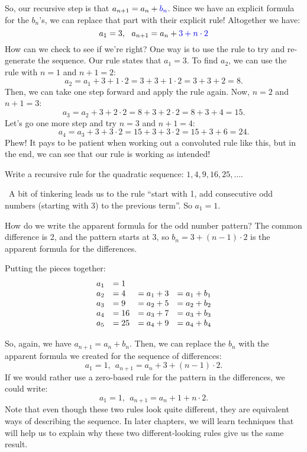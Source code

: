 So, our recursive step is that $a_{n+1} = a_n + {\color{blue!90!black}b_n}$. Since we have an explicit formula for the $b_n$'s, we can replace that part with their explicit rule! Altogether we have:
\[a_1 = 3, ~~ a_{n+1} = a_n + {\color{blue!90!black}3 + n\cdot 2}\]
How can we check to see if we're right? One way is to use the rule to try and re-generate the sequence. Our rule states that $a_1 = 3$. To find $a_2$, we can use the rule with $n=1$ and $n+1 = 2$:
\[a_2 = a_1 + 3 + 1 \cdot 2 = 3 + 3 + 1 \cdot 2 = 3 + 3 + 2 = 8.\]
Then, we can take one step forward and apply the rule again. Now, $n=2$ and $n+1 = 3$:
\[a_3 = a_2 + 3 + 2 \cdot 2 = 8 + 3 + 2 \cdot 2 = 8 + 3 + 4 = 15.\]
Let's go one more step and try $n=3$ and $n+1=4$:
\[a_4 = a_3 + 3 + 3 \cdot 2 = 15 + 3 + 3 \cdot 2 = 15 + 3 + 6 = 24.\]
Phew! It pays to be patient when working out a convoluted rule like this, but in the end, we can see that our rule is working as intended!

\begin{boxedex}
Write a recursive rule for the quadratic sequence: $1, 4, 9, 16, 25, \dotsc$.

\exsoln\ A bit of tinkering leads us to the rule ``start with 1, add consecutive odd numbers (starting with 3) to the previous term''. So $a_1 = 1$.

How do we write the apparent formula for the odd number pattern? The common difference is 2, and the pattern starts at 3, so $b_n = 3 + (n-1)\cdot2$ is the apparent formula for the differences.

Putting the pieces together:
\[\begin{array}{l@{\quad}l@{\quad}l@{\quad}l}
a_1 &= 1\\
a_2 &= 4	&= a_1 + 3		&= a_1 + b_1\\
a_3 &= 9	&= a_2 + 5		&= a_2 + b_2\\
a_4 &= 16	&= a_3 + 7		&= a_3 + b_3\\
a_5 &= 25	&= a_4 + 9		&= a_4 + b_4
\end{array}\]

So, again, we have $a_{n+1} = a_n + b_n$. Then, we can replace the $b_n$ with the apparent formula we created for the sequence of differences:
\[a_1 = 1, ~~ a_{n+1} = a_n + 3 + (n-1)\cdot 2.\]
If we would rather use a zero-based rule for the pattern in the differences, we could write:
\[a_1 = 1, ~~ a_{n+1} = a_n + 1 + n \cdot 2.\]
Note that even though these two rules look quite different, they are equivalent ways of describing the sequence. In later chapters, we will learn techniques that will help us to explain why these two different-looking rules give us the same result.
\end{boxedex}


